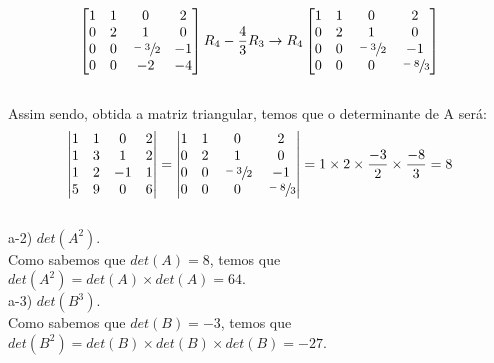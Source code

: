 \\
\[
    \begin{bmatrix}
        1 & 1 & 0             & 2  \\
        0 & 2 & 1             & 0  \\
        0 & 0 & \sfrac{-3}{2} & -1 \\
        0 & 0 & -2            & -4
    \end{bmatrix}
    R_4 - \frac{4}{3}R_3 \to R_4
    \begin{bmatrix}
        1 & 1 & 0             & 2             \\
        0 & 2 & 1             & 0             \\
        0 & 0 & \sfrac{-3}{2} & -1            \\
        0 & 0 & 0             & \sfrac{-8}{3}
    \end{bmatrix}
\]
\\

Assim sendo, obtida a matriz triangular, temos que o determinante de A será:
\\

\begin{equation}
    \left|\begin{matrix}
        1 & 1 & 0  & 2 \\
        1 & 3 & 1  & 2 \\
        1 & 2 & -1 & 1 \\
        5 & 9 & 0  & 6
    \end{matrix}\right| =
    \left|\begin{matrix}
        1 & 1 & 0             & 2             \\
        0 & 2 & 1             & 0             \\
        0 & 0 & \sfrac{-3}{2} & -1            \\
        0 & 0 & 0             & \sfrac{-8}{3}
    \end{matrix}\right|= 1\times 2 \times \frac{-3}{2} \times \frac{-8}{3} = 8
\end{equation}
\\

a-2) $det(A^2)$.
\\

Como sabemos que $det(A) = 8$, temos que \textcolor{COLOR2}{$det(A^2) = det(A)\times det(A) = 64$}.\\

a-3) $det(B^3)$.
\\

Como sabemos que $det(B) = -3$, temos que \textcolor{COLOR2}{$det(B^2) = det(B)\times det(B) \times det(B) = -27$}.\\

